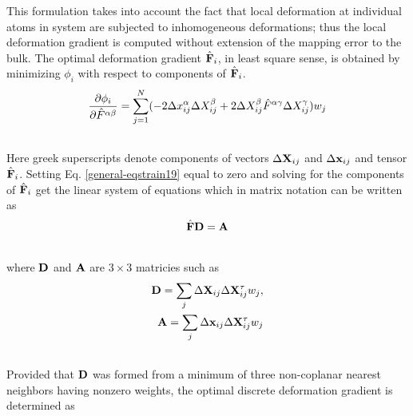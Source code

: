\documentclass[letterpaper,10pt,english]{sphinxmanual}
\begin{document}
This formulation takes into account the fact that local deformation at individual atoms in system are subjected to inhomogeneous deformations; thus the local deformation gradient is computed without extension of the mapping error to the bulk. The optimal deformation gradient $\hat {\bf F}_{i}$, in least square sense, is obtained by minimizing $\phi_{i}$ with respect to components of $\hat {\bf F}_{i}$.
\label{general:equation-eqstrain19}\begin{gather}
\begin{split}\frac{\partial \phi_{i}}{\partial \hat F^{\alpha \beta}} = \sum_{j=1}^{N}(-2 \Delta x_{ij}^{\alpha} \Delta X_{ij}^{\beta} + 2 \Delta X_{ij}^{\beta} \hat F^{\alpha \gamma} \Delta X_{ij}^{\gamma}) w_j\end{split}\label{general-eqstrain19}\\\begin{split}\end{split}\notag
\end{gather}
Here greek superscripts denote components of vectors $\Delta {\bf X}_{ij}$ and $\Delta {\bf x}_{ij}$ and tensor $\hat{\bf F}_{i}$. Setting Eq. \eqref{general-eqstrain19} equal to zero and solving for the components of $\hat{\bf F}_{i}$ get the linear system of equations which in matrix notation can be written as
\begin{gather}
\begin{split}\hat{\bf F} {\bf D} = {\bf A}\end{split}\notag\\\begin{split}\end{split}\notag
\end{gather}
where ${\bf D}$ and ${\bf A}$ are $3 \times 3$ matricies such as
\label{general:equation-defgradAD}\begin{gather}
\begin{split}\begin{split}
{\bf D} = \sum_{j}\Delta {\bf X}_{ij} \Delta {\bf X}_{ij}^{\tau} w_{j}, \\
{\bf A} = \sum_{j}\Delta {\bf x}_{ij} \Delta {\bf X}_{ij}^{\tau} w_{j}
\end{split}\end{split}\label{general-defgradAD}\\\begin{split}\end{split}\notag
\end{gather}
Provided that ${\bf D}$ was formed from a minimum of three non-coplanar nearest neighbors having nonzero weights, the optimal discrete deformation gradient is determined as
\end{document}
